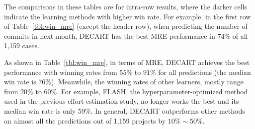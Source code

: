 \documentclass[smallextended]{svjour3}
\newcommand{\tbl}[1]{Table~\ref{tbl:#1}}
\newcommand{\respto}[1]{
\fcolorbox{black}{black!15}{%
\label{resp:#1}%
\bf\scriptsize R{#1}}}
\newcommand{\BLUE}{\color{blue}}
\newcommand{\BLACK}{\color{black}}
\begin{document}
The comparisons in these tables are for intra-row results, where the darker cells indicate the learning methods with higher win rate. For example, in the first row of \tbl{win_mre} (except the header row), when predicting the number of commits in next month, DECART has the best MRE performance in 74\% of all 1,159 cases. 

As shown in \tbl{win_mre}, in terms of MRE, DECART achieves the best performance with winning rates from $55\%$ to $91\%$ for all predictions (the median win rate is 76\%). 
\BLUE
Meanwhile, the winning rates of other learners, mostly range from $20\%$ to $60\%$. \respto{2A2} For example, FLASH, the hyperparameter-optimized method used in the previous effort estimation study, no longer works the best and its median win rate is only 59\%. 
In general, DECART outperforms other methods on almost all the predictions out of 1,159 projects by $10\% \sim 50\%$.
\BLACK
\end{document}
